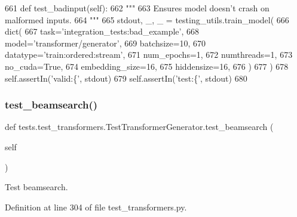 \begin{DoxyCode}
661     \textcolor{keyword}{def }test\_badinput(self):
662         \textcolor{stringliteral}{"""}
663 \textcolor{stringliteral}{        Ensures model doesn't crash on malformed inputs.}
664 \textcolor{stringliteral}{        """}
665         stdout, \_, \_ = testing\_utils.train\_model(
666             dict(
667                 task=\textcolor{stringliteral}{'integration\_tests:bad\_example'},
668                 model=\textcolor{stringliteral}{'transformer/generator'},
669                 batchsize=10,
670                 datatype=\textcolor{stringliteral}{'train:ordered:stream'},
671                 num\_epochs=1,
672                 numthreads=1,
673                 no\_cuda=\textcolor{keyword}{True},
674                 embedding\_size=16,
675                 hiddensize=16,
676             )
677         )
678         self.assertIn(\textcolor{stringliteral}{'valid:\{'}, stdout)
679         self.assertIn(\textcolor{stringliteral}{'test:\{'}, stdout)
680 
\end{DoxyCode}
\mbox{\label{classtests_1_1test__transformers_1_1TestTransformerGenerator_af16ba00a7a4c07df6bed84c8aad2635c}} 
\subsubsection{\texorpdfstring{test\+\_\+beamsearch()}{test\_beamsearch()}}
{\footnotesize\ttfamily def tests.\+test\+\_\+transformers.\+Test\+Transformer\+Generator.\+test\+\_\+beamsearch (\begin{DoxyParamCaption}\item[{}]{self }\end{DoxyParamCaption})}

\begin{DoxyVerb}Test beamsearch.
\end{DoxyVerb}
 

Definition at line 304 of file test\+\_\+transformers.\+py.


